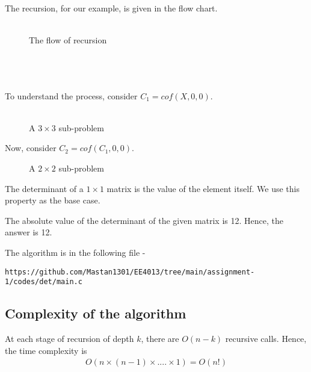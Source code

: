 \documentclass[journal,12pt,twocolumn]{IEEEtran}
\begin{document}
The recursion, for our example, is given in the flow chart. \\ \\

\begin{figure}[h!]
	\begin{center}
		\resizebox{\columnwidth/1}{!}{}
	\end{center}
	\caption{The flow of recursion}
	\label{fig:fig1}
\end{figure}

\\ \\ \\ To understand the process, consider $C_1 = cof(X, 0, 0)$. \\ \\

\begin{figure}[h!]
	\begin{center}
		\resizebox{\columnwidth/1}{!}{}
	\end{center}
	\caption{A $3 \times 3$ sub-problem}
	\label{fig:fig2}
\end{figure}

Now, consider $C_2 = cof(C_1, 0, 0)$. 

\begin{figure}[h!]
	\begin{center}
		\resizebox{\columnwidth/1}{!}{}
	\end{center}
	\caption{A $2 \times 2$ sub-problem}
	\label{fig:fig3}
\end{figure}

The determinant of a $1 \times 1$ matrix is the value of the element itself. We use this property as the base case.

The absolute value of the determinant of the given matrix is 12. Hence, the answer is 12.

The algorithm is in the following file - 
\begin{lstlisting}
https://github.com/Mastan1301/EE4013/tree/main/assignment-1/codes/det/main.c
\end{lstlisting}

\subsection{Complexity of the algorithm}
At each stage of recursion of depth $k$, there are $O(n - k)$ recursive calls. Hence, the time complexity is 
    \begin{align*}
        O(n \times (n - 1) \times .... \times 1) = O(n!)
    \end{align*}
\end{document}
